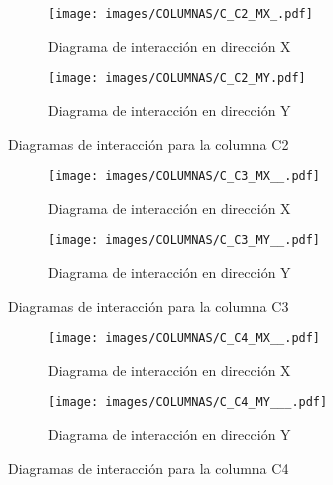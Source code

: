 
\begin{figure}[H]
     \centering
     \begin{subfigure}[b]{0.45\textwidth}
         \centering
         \texttt{[image: images/COLUMNAS/C\_C2\_MX\_.pdf]}
         \caption{Diagrama de interacción en dirección X}
         \label{fig:CC2 X}
     \end{subfigure}
     \hfill
     \begin{subfigure}[b]{0.45\textwidth}
         \centering
         \texttt{[image: images/COLUMNAS/C\_C2\_MY.pdf]}
         \caption{Diagrama de interacción en dirección Y}
         \label{fig:CC2 Y}
     \end{subfigure}
    
        \caption{Diagramas de interacción para la columna C2}
        \label{fig:C2}
\end{figure}


\begin{figure}[H]
     \centering
     \begin{subfigure}[b]{0.45\textwidth}
         \centering
         \texttt{[image: images/COLUMNAS/C\_C3\_MX\_\_.pdf]}
         \caption{Diagrama de interacción en dirección X}
         \label{fig:CC3 X}
     \end{subfigure}
     \hfill
     \begin{subfigure}[b]{0.45\textwidth}
         \centering
         \texttt{[image: images/COLUMNAS/C\_C3\_MY\_\_.pdf]}
         \caption{Diagrama de interacción en dirección Y}
         \label{fig:CC3 Y}
     \end{subfigure}
    
        \caption{Diagramas de interacción para la columna C3}
        \label{fig:C3}
\end{figure}


\begin{figure}[H]
     \centering
     \begin{subfigure}[b]{0.45\textwidth}
         \centering
         \texttt{[image: images/COLUMNAS/C\_C4\_MX\_\_.pdf]}
         \caption{Diagrama de interacción en dirección X}
         \label{fig:CC4 X}
     \end{subfigure}
     \hfill
     \begin{subfigure}[b]{0.45\textwidth}
         \centering
         \texttt{[image: images/COLUMNAS/C\_C4\_MY\_\_\_.pdf]}
         \caption{Diagrama de interacción en dirección Y}
         \label{fig:CC4 Y}
     \end{subfigure}
    
        \caption{Diagramas de interacción para la columna C4}
        \label{fig:C4}
\end{figure}

